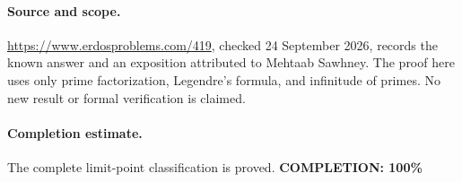 \paragraph{Source and scope.}
\url{https://www.erdosproblems.com/419}, checked 24 September 2026,
records the known answer and an exposition attributed to Mehtaab Sawhney.
The proof here uses only prime factorization, Legendre's formula, and
infinitude of primes. No new result or formal verification is claimed.

\paragraph{Completion estimate.}
The complete limit-point classification is proved.
\textbf{COMPLETION: 100\%}
